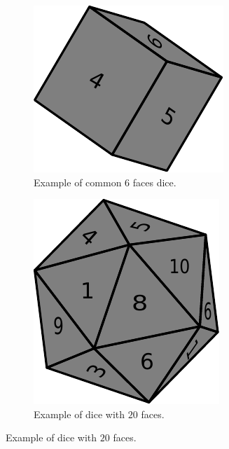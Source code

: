 \begin{figure}
\begin{subfigure}[t]{0.25\textwidth}
		\includegraphics[width=1\linewidth]{sources/dice_rolls/images/cubic_dice}
		\caption{Example of common $6$ faces dice.}
		\label{fig:dice_rolls:6faces_dice}
	 \end{subfigure}
	 \hfill
	 \begin{subfigure}[t]{0.25\textwidth}
		 \includegraphics[width=1\linewidth]{sources/dice_rolls/images/icosahedron_dice}
		 \caption{Example of dice with $20$ faces.}
		 \label{fig:dice_rolls:20faces_dice}
	  \end{subfigure}
\end{figure}

